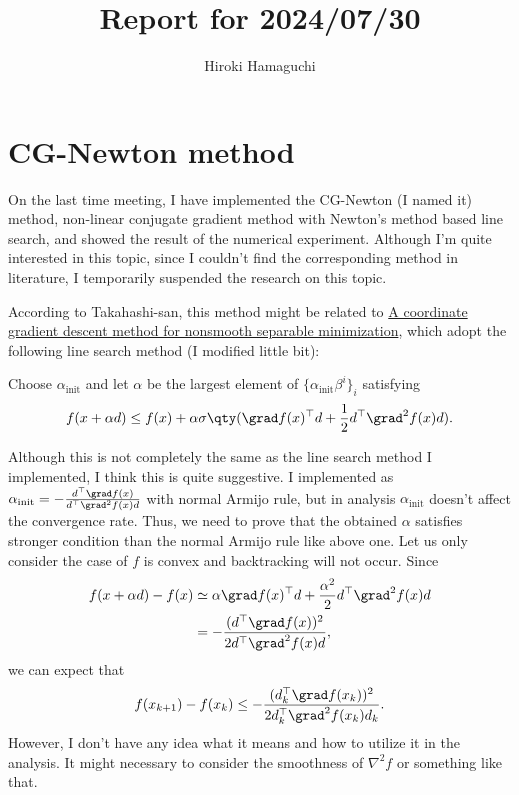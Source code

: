 \documentclass[\main/main]{subfiles}
\begin{document}
\title{Report for 2024/07/30}
\author{Hiroki Hamaguchi}
\maketitle

\section{CG-Newton method}

On the last time meeting, I have implemented the CG-Newton (I named it) method, non-linear conjugate gradient method with Newton's method based line search, and showed the result of the numerical experiment.
Although I'm quite interested in this topic, since I couldn't find the corresponding method in literature, I temporarily suspended the research on this topic.

According to Takahashi-san, this method might be related to \href{https://link-springer-com.utokyo.idm.oclc.org/article/10.1007/s10107-007-0170-0}{A coordinate gradient descent method for nonsmooth separable minimization}, which adopt the following line search method (I modified little bit):
\begin{screen}
  Choose $\alpha_{\mathrm{init}}$ and let $\alpha$ be the largest element of $\{ \alpha_{\mathrm{init}} \beta^i \}_{i}$ satisfying
  \begin{equation*}
    f(x+\alpha d) \leq f(x) + \alpha \sigma \qty(\grad f(x)^\top d+ \frac{1}{2} d^\top \grad^2 f(x) d).
  \end{equation*}
\end{screen}
Although this is not completely the same as the line search method I implemented, I think this is quite suggestive.
I implemented as $\alpha_{\mathrm{init}} = -\frac{d^\top \grad f(x)}{d^\top \grad^2 f(x) d}$ with normal Armijo rule, but in analysis $\alpha_{\mathrm{init}}$ doesn't affect the convergence rate. Thus, we need to prove that the obtained $\alpha$ satisfies stronger condition than the normal Armijo rule like above one.
Let us only consider the case of $f$ is convex and backtracking will not occur. Since
\begin{align*}
  f(x+\alpha d) - f(x) & \simeq \alpha \grad f(x)^\top d + \frac{\alpha^2}{2} d^\top \grad^2 f(x) d \\
                       & = -\frac{(d^\top \grad f(x))^2}{2d^\top \grad^2 f(x) d},
\end{align*}
we can expect that
\begin{equation*}
  f(x_{k+1}) - f(x_k) \leq -\frac{(d_k^\top \grad f(x_k))^2}{2d_k^\top \grad^2 f(x_k) d_k}.
\end{equation*}
However, I don't have any idea what it means and how to utilize it in the analysis.
It might necessary to consider the smoothness of $\nabla^2 f$ or something like that.
\end{document}
